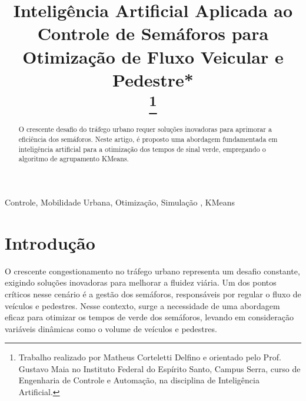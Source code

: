 \documentclass[a4paper, 10pt, conference]{IEEEtran}
\begin{document}
\title{Inteligência Artificial Aplicada ao Controle de Semáforos para Otimização de Fluxo Veicular e Pedestre*\\
\thanks{Trabalho realizado por Matheus Corteletti Delfino e orientado pelo Prof. Gustavo Maia no Instituto Federal do Espírito Santo, Campus Serra, curso de Engenharia de Controle e Automação, na disciplina de Inteligência Artificial.}
}

\author{
\and
{}
}

\maketitle


\begin{abstract}
O crescente desafio do tráfego urbano requer soluções inovadoras para aprimorar a eficiência dos semáforos. Neste artigo, é proposto uma abordagem fundamentada em inteligência artificial para a otimização dos tempos de sinal verde, empregando o algoritmo de agrupamento KMeans.
\end{abstract}

\begin{IEEEkeywords}
Controle, Mobilidade Urbana, Otimização, Simulação , KMeans
\end{IEEEkeywords}

\section{Introdução}
O crescente congestionamento no tráfego urbano representa um desafio constante, exigindo soluções inovadoras para melhorar a fluidez viária. Um dos pontos críticos nesse cenário é a gestão dos semáforos, responsáveis por regular o fluxo de veículos e pedestres. Nesse contexto, surge a necessidade de uma abordagem eficaz para otimizar os tempos de verde dos semáforos, levando em consideração variáveis dinâmicas como o volume de veículos e pedestres.
\end{document}
